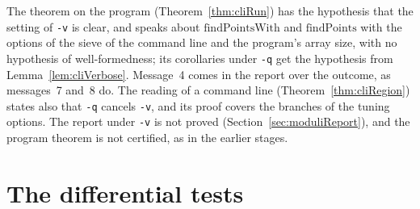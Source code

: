 The theorem on the program (Theorem~\ref{thm:cliRun}) has the hypothesis that the setting of
\verb|-v| is clear, and speaks about $\mathrm{findPointsWith}$ and $\mathrm{findPoints}$ with the
options of the sieve of the command line and the program's array size, with no hypothesis of
well-formedness; its corollaries under \verb|-q| get the hypothesis from Lemma~\ref{lem:cliVerbose}.
Message~4 comes in the report over the outcome, as messages~7 and~8 do. The reading of a command
line (Theorem~\ref{thm:cliRegion}) states also that \verb|-q| cancels \verb|-v|, and its proof
covers the branches of the tuning options. The report under \verb|-v| is not proved
(Section~\ref{sec:moduliReport}), and the program theorem is not certified, as in the earlier
stages.

\section{The differential tests}\label{sec:moduliTests}

